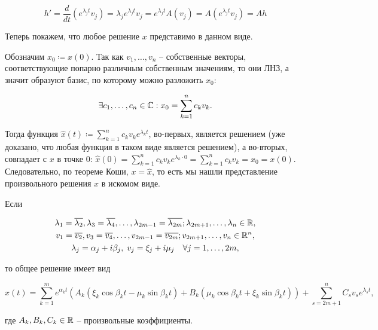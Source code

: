 \begin{equation*}
    h' = \frac{d}{dt} (e^{\lambda_j t} v_j) = \lambda_j e^{\lambda_j t} v_j = e^{\lambda_j t} A(v_j) = A(e^{\lambda_j t} v_j) = Ah
\end{equation*}

Теперь покажем, что любое решение $x$ представимо в данном виде.

Обозначим $x_0 \coloneqq x(0)$.
Так как $v_1, \dots, v_n$ -- собственные векторы, соответствующие попарно различным собственным значениям, то они ЛНЗ, а значит образуют базис, по которому можно разложить $x_0$:

\begin{equation*}
    \exists c_1, \dots, c_n \in \mathbb{C}: x_0 = \sum_{k=1}^n c_k v_k.
\end{equation*}

Тогда функция $\hat{x}(t) \coloneqq \sum_{k=1}^n c_k v_k e^{\lambda_k t}$, во-первых, является решением (уже доказано, что любая функция в таком виде является решением), а во-вторых, совпадает с $x$ в точке $0$: $\hat{x}(0) = \sum_{k=1}^n c_k v_k e^{\lambda_k \cdot 0} = \sum_{k=1}^n c_k v_k = x_0 = x(0)$.
Следовательно, по теореме Коши, $x = \hat{x}$, то есть мы нашли представление произвольного решения $x$ в искомом виде.

\Endproof


Если

\begin{gather*}
    \lambda_1 = \overline{\lambda_2}, \lambda_3 = \overline{\lambda_4}, \dots, \lambda_{2m-1} = \overline{\lambda_{2m}}; \lambda_{2m+1}, \dots, \lambda_n \in \mathbb{R}, \\
    v_1 = \overline{v_2}, v_3 = \overline{v_4}, \dots, v_{2m-1} = \overline{v_{2m}}; v_{2m+1}, \dots, v_n \in \mathbb{R}^n, \\
    \lambda_j = \alpha_j + i\beta_j, \; v_j = \xi_j + i\mu_j \quad \forall j = 1, \dots, 2m,
\end{gather*}

то общее решение имеет вид

\begin{equation*}
    x(t) = \sum_{k=1}^m e^{\alpha_k t} \left( A_k \left( \xi_k \cos \beta_k t - \mu_k \sin \beta_k t \right) +  B_k \left(\mu_k \cos \beta_k t + \xi_k \sin \beta_k t \right) \right) + \sum_{s=2m+1}^n C_s v_s e^{\lambda_s t},
\end{equation*}

где $A_k, B_k, C_k \in \mathbb{R}$ -- произвольные коэффициенты.

